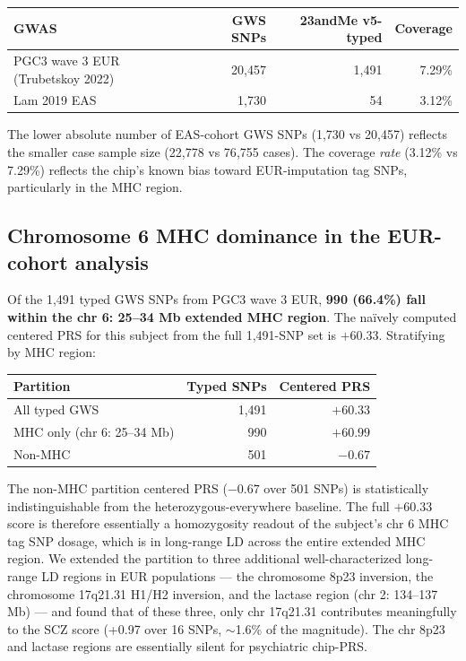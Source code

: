 \documentclass[11pt,a4paper]{article}
\begin{document}
\begin{center}
\begin{tabular}{lrrr}
\toprule
GWAS & GWS SNPs & 23andMe v5-typed & Coverage \\
\midrule
PGC3 wave 3 EUR (Trubetskoy 2022) & 20{,}457 & 1{,}491 & 7.29\% \\
Lam 2019 EAS                       &  1{,}730 &     54 & 3.12\% \\
\bottomrule
\end{tabular}
\end{center}

The lower absolute number of EAS-cohort GWS SNPs (1{,}730 vs 20{,}457) reflects the smaller case sample size (22{,}778 vs 76{,}755 cases). The coverage \emph{rate} (3.12\% vs 7.29\%) reflects the chip's known bias toward EUR-imputation tag SNPs, particularly in the MHC region.

\subsection{Chromosome 6 MHC dominance in the EUR-cohort analysis}

Of the 1{,}491 typed GWS SNPs from PGC3 wave 3 EUR, \textbf{990 (66.4\%) fall within the chr 6: 25--34 Mb extended MHC region}. The naïvely computed centered PRS for this subject from the full 1{,}491-SNP set is $+60.33$. Stratifying by MHC region:

\begin{center}
\begin{tabular}{lrr}
\toprule
Partition & Typed SNPs & Centered PRS \\
\midrule
All typed GWS                       & 1{,}491 & $+60.33$ \\
MHC only (chr 6: 25--34 Mb)         &     990 & $+60.99$ \\
Non-MHC                             &     501 & $-0.67$ \\
\bottomrule
\end{tabular}
\end{center}

The non-MHC partition centered PRS ($-0.67$ over 501 SNPs) is statistically indistinguishable from the heterozygous-everywhere baseline. The full $+60.33$ score is therefore essentially a homozygosity readout of the subject's chr 6 MHC tag SNP dosage, which is in long-range LD across the entire extended MHC region. We extended the partition to three additional well-characterized long-range LD regions in EUR populations --- the chromosome 8p23 inversion, the chromosome 17q21.31 H1/H2 inversion, and the lactase region (chr 2: 134--137 Mb) --- and found that of these three, only chr 17q21.31 contributes meaningfully to the SCZ score (+0.97 over 16 SNPs, $\sim$1.6\% of the magnitude). The chr 8p23 and lactase regions are essentially silent for psychiatric chip-PRS.
\end{document}
